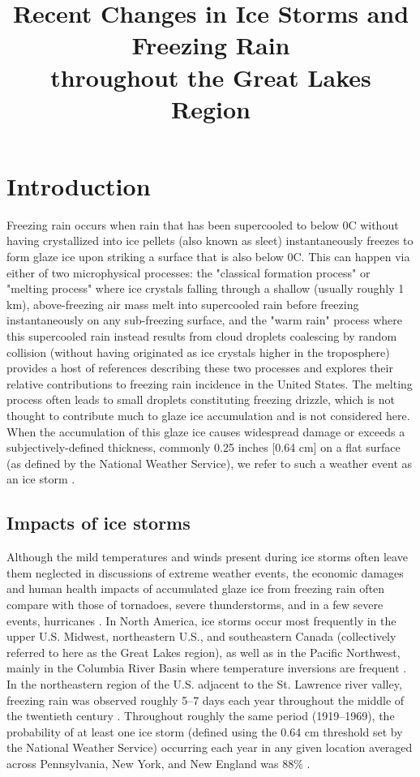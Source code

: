 \documentclass[twocol]{ametsoc}
\title{Recent Changes in Ice Storms and Freezing Rain\\ throughout the Great Lakes Region}
\affiliation{ National Renewable Energy Laboratory, Golden, Colorado}
\begin{document}
\maketitle
%
\section{Introduction}
Freezing rain occurs when rain that has been supercooled to below 0\degree C without having crystallized into ice pellets (also known as sleet) instantaneously freezes to form glaze ice upon striking a surface that is also below 0\degree C. This can happen via either of two microphysical processes: the "classical formation process" or "melting process" where ice crystals falling through a shallow (usually roughly 1 km), above-freezing air mass melt into supercooled rain before freezing instantaneously on any sub-freezing surface, and the "warm rain" process where this supercooled rain instead results from cloud droplets coalescing by random collision (without having originated as ice crystals higher in the troposphere) \citet{rauber2000relative} provides a host of references describing these two processes and explores their relative contributions to freezing rain incidence in the United States. The melting process often leads to small droplets constituting freezing drizzle, which is not thought to contribute much to glaze ice accumulation and is not considered here. When the accumulation of this glaze ice causes widespread damage or exceeds a subjectively-defined thickness, commonly 0.25 inches [0.64 cm] on a flat surface (as defined by the National Weather Service), we refer to such a weather event as an ice storm \citep{nwsglossary}.

\subsection{Impacts of ice storms}
Although the mild temperatures and winds present during ice storms often leave them neglected in discussions of extreme weather events, the economic damages and human health impacts of accumulated glaze ice from freezing rain often compare with those of tornadoes, severe thunderstorms, and in a few severe events, hurricanes \citep{lott2006tracking}. In North America, ice storms occur most frequently in the upper U.S. Midwest, northeastern U.S., and southeastern Canada (collectively referred to here as the Great Lakes region), as well as in the Pacific Northwest, mainly in the Columbia River Basin where temperature inversions are frequent \citep{changnon2003temporal, bernstein2000regional}. In the northeastern region of the U.S. adjacent to the St. Lawrence river valley, freezing rain was observed roughly 5--7 days each year throughout the middle of the twentieth century \citep{changnon2003temporal}. Throughout roughly the same period (1919--1969), the probability of at least one ice storm (defined using the 0.64 cm threshold set by the National Weather Service) occurring each year in any given location averaged across Pennsylvania, New York, and New England was 88\% \citep{tattelman1973estimated}. 
\end{document}
